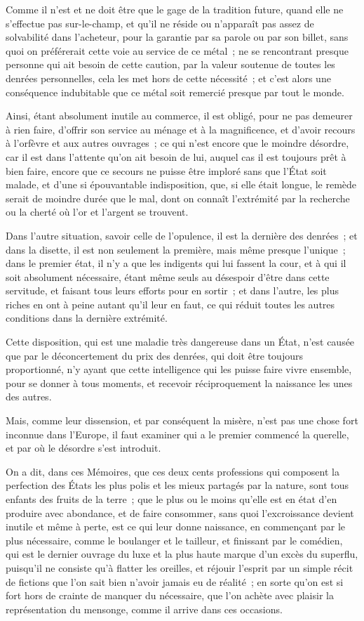 \documentclass[french,twoside]{book} %
\begin{document}
Comme il n’est et ne doit être que le gage de la tradition future, quand elle ne s’effectue pas sur-le-champ, et qu’il ne réside ou n’apparaît pas assez de solvabilité dans l’acheteur, pour la garantie par sa parole ou par son billet, sans quoi on préférerait cette voie au service de ce métal ; ne se rencontrant presque personne qui ait besoin de cette caution, par la valeur soutenue de toutes les denrées personnelles, cela les met hors de cette nécessité ; et c’est alors une conséquence indubitable que ce métal soit remercié presque par tout le monde.\par
Ainsi, étant absolument inutile au commerce, il est obligé, pour ne pas demeurer à rien faire, d’offrir son service au ménage et à la magnificence, et d’avoir recours à l’orfèvre et aux autres ouvrages ; ce qui n’est encore que le moindre désordre, car il est dans l’attente qu’on ait besoin de lui, auquel cas il est toujours prêt à bien faire, encore que ce secours ne puisse être imploré sans que l’État soit malade, et d’une si épouvantable indisposition, que, si elle était longue, le remède serait de moindre durée que le mal, dont on connaît l’extrémité par la recherche ou la cherté où l’or et l’argent se trouvent.\par
Dans l’autre situation, savoir celle de l’opulence, il est la dernière des denrées ; et dans la disette, il est non seulement la première, mais même presque l’unique ; dans le premier état, il n’y a que les indigents qui lui fassent la cour, et à qui il soit absolument nécessaire, étant même seuls au désespoir d’être dans cette servitude, et faisant tous leurs efforts pour en sortir ; et dans l’autre, les plus riches en ont à peine autant qu’il leur en faut, ce qui réduit toutes les autres conditions dans la dernière extrémité.\par
Cette disposition, qui est une maladie très dangereuse dans un État, n’est causée que par le déconcertement du prix des denrées, qui doit être toujours proportionné, n’y ayant que cette intelligence qui les puisse faire vivre ensemble, pour se donner à tous moments, et recevoir réciproquement la naissance les unes des autres.\par
Mais, comme leur dissension, et par conséquent la misère, n’est pas une chose fort inconnue dans l’Europe, il faut examiner qui a le premier commencé la querelle, et par où le désordre s’est introduit.\par
On a dit, dans ces Mémoires, que ces deux cents professions qui composent la perfection des États les plus polis et les mieux partagés par la nature, sont tous enfants des fruits de la terre ; que le plus ou le moins qu’elle est en état d’en produire avec abondance, et de faire consommer, sans quoi l’excroissance devient inutile et même à perte, est ce qui leur donne naissance, en commençant par le plus nécessaire, comme le boulanger et le tailleur, et finissant par le comédien, qui est le dernier ouvrage du luxe et la plus haute marque d’un excès du superflu, puisqu’il ne consiste qu’à flatter les oreilles, et réjouir l’esprit par un simple récit de fictions que l’on sait bien n’avoir jamais eu de réalité ; en sorte qu’on est si fort hors de crainte de manquer du nécessaire, que l’on achète avec plaisir la représentation du mensonge, comme il arrive dans ces occasions.\par
\end{document}
